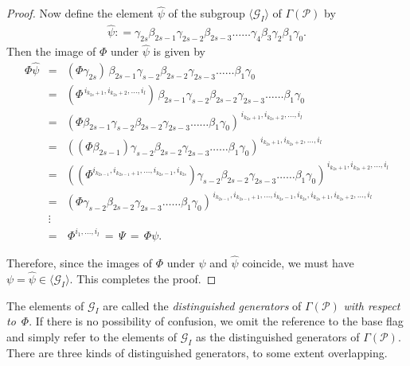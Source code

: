 \documentclass[12pt]{article}
\renewcommand{\>}{\rangle}
\theoremstyle{definition}\newtheorem{definition}{Definition}[section]
\begin{document}
\begin{proof}
Now define the element $\widehat{\psi}$ of the subgroup $\langle\mathcal{G}_{I}\rangle$ of $\Gamma(\mathcal{P})$ by
\begin{eqnarray}
\label{star}
\widehat{\psi}: =\gamma_{2s} \beta_{2s-1} \gamma_{2s-2} \beta_{2s-3} \ldots\ldots \gamma_4 \beta_3 \gamma_2 \beta_1 \gamma_{0}.
\end{eqnarray}
Then the image of $\Phi$ under $\widehat{\psi}$ is given by
\[ \begin{array}{lll}
\Phi\widehat{\psi} 
&=& (\Phi\gamma_{2s})\,\beta_{2s-1}\gamma_{s-2}\beta_{2s-2}\gamma_{2s-3}\ldots\ldots\beta_{1}\gamma_{0}\\[.05in]
&=& (\Phi^{\,i_{k_{2s}+1},i_{k_{2s}+2},\ldots,i_l})\,\beta_{2s-1}\gamma_{s-2}\beta_{2s-2}\gamma_{2s-3}\ldots\ldots\beta_{1}\gamma_{0}\\[.05in]
&=& (\Phi\beta_{2s-1}\gamma_{s-2}\beta_{2s-2}\gamma_{2s-3}\ldots\ldots\beta_{1}\gamma_{0})^{\,i_{k_{2s}+1},i_{k_{2s}+2},\ldots,i_l}\\[.05in]
&=& ((\Phi\beta_{2s-1})\gamma_{s-2}\beta_{2s-2}\gamma_{2s-3}\ldots\ldots\beta_{1}\gamma_{0})^{\,i_{k_{2s}+1},i_{k_{2s}+2},\ldots,i_l}\\[.05in]
&=& ((\Phi^{i_{k_{2s-1}}, i_{k_{2s-1}+1}, \dots, i_{k_{2s}-1} , i_{k_{2s}}})\gamma_{s-2}\beta_{2s-2}\gamma_{2s-3}\ldots\ldots\beta_{1}\gamma_{0})^{\,i_{k_{2s}+1},i_{k_{2s}+2},\ldots,i_l}\\[.05in]
&=& (\Phi\gamma_{s-2}\beta_{2s-2}\gamma_{2s-3}\ldots\ldots\beta_{1}\gamma_{0})^{\,{i_{k_{2s-1}}, i_{k_{2s-1}+1}, \ldots, i_{k_{2s}-1},i_{k_{2s}}},i_{k_{2s}+1},i_{k_{2s}+2},\ldots,i_l}\\[.02in]
&\vdots&\\[.02in]
&=&\, \Phi^{i_1,\ldots,i_l} \,=\, \Psi \,=\, \Phi\psi.
\end{array} \]

Therefore, since the images of $\Phi$ under $\psi$ and $\widehat {\psi}$ coincide, we must have $\psi=\widehat{\psi}\in\langle\mathcal{G}_{I}\rangle$. This completes the proof.
\end{proof}
\smallskip

The elements of $\mathcal{G}_{I}$ are called the {\em distinguished generators} of $\Gamma(\mathcal{P})$ {\em with respect to\/}~$\Phi$. If there is no possibility of confusion, we omit the reference to the base flag and simply refer to the  elements of $\mathcal{G}_{I}$ as the distinguished generators of $\Gamma(\mathcal{P})$. There are three kinds of distinguished generators, to some extent overlapping. 
\end{document}
